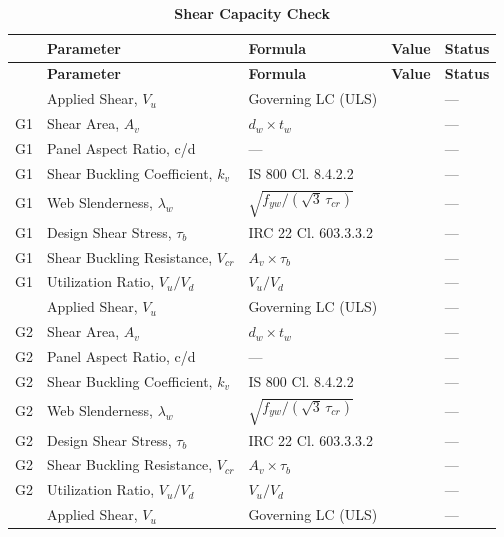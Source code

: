 \documentclass[12pt,a4paper]{report}
\numberwithin{table}{chapter}
\numberwithin{figure}{chapter}
\newcommand{\ReportTableGap}{\vspace{1em}}
\begin{document}
\ReportTableGap
\begin{longtable}{|C{2.5cm}|C{3.5cm}|C{3.5cm}|>{\centering\arraybackslash}p{4.2cm}|C{1.8cm}|}
\caption{\textbf{Shear Capacity Check}}\\
\hline
\textbf{} & \textbf{Parameter} & \textbf{Formula} & \textbf{Value} & \textbf{Status} \\[6pt]
\hline
\endfirsthead
\hline
\textbf{} & \textbf{Parameter} & \textbf{Formula} & \textbf{Value} & \textbf{Status} \\[6pt]
\hline
\endhead

 & Applied Shear, $V_u$ & Governing LC (ULS) &  & --- \\[6pt]
G1 & Shear Area, $A_v$ & $d_w \times t_w$ &  & --- \\[6pt]
G1 & Panel Aspect Ratio, c/d & --- &  & --- \\[6pt]
G1 & Shear Buckling Coefficient, $k_v$ & IS 800 Cl. 8.4.2.2 &  & --- \\[6pt]
G1 & Web Slenderness, $\lambda_w$ & $\sqrt{f_{yw}/(\sqrt{3}\,\tau_{cr})}$ &  & --- \\[6pt]
G1 & Design Shear Stress, $\tau_b$ & IRC 22 Cl. 603.3.3.2 &  & --- \\[6pt]
G1 & Shear Buckling Resistance, $V_{cr}$ & $A_v \times \tau_b$ &  & --- \\[6pt]
G1 & Utilization Ratio, $V_u / V_d$ & $V_u / V_d$ &  & --- \\[6pt]
\hline
{} & Applied Shear, $V_u$ & Governing LC (ULS) &  & --- \\[6pt]
G2 & Shear Area, $A_v$ & $d_w \times t_w$ &  & --- \\[6pt]
G2 & Panel Aspect Ratio, c/d & --- &  & --- \\[6pt]
G2 & Shear Buckling Coefficient, $k_v$ & IS 800 Cl. 8.4.2.2 &  & --- \\[6pt]
G2 & Web Slenderness, $\lambda_w$ & $\sqrt{f_{yw}/(\sqrt{3}\,\tau_{cr})}$ &  & --- \\[6pt]
G2 & Design Shear Stress, $\tau_b$ & IRC 22 Cl. 603.3.3.2 &  & --- \\[6pt]
G2 & Shear Buckling Resistance, $V_{cr}$ & $A_v \times \tau_b$ &  & --- \\[6pt]
G2 & Utilization Ratio, $V_u / V_d$ & $V_u / V_d$ &  & --- \\[6pt]
\hline
{} & Applied Shear, $V_u$ & Governing LC (ULS) &  & --- \\[6pt]

\end{longtable}
\end{document}
